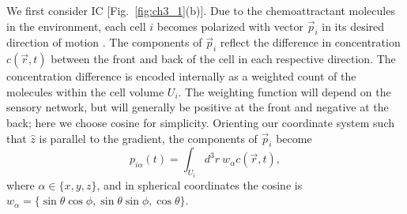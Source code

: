 We first consider IC [Fig.\ \ref{fig:ch3_1}(b)]. Due to the chemoattractant molecules in the environment, each cell $i$ becomes polarized with vector $\vec{p}_i$ in its desired direction of motion \cite{jilkine2011comparison}. The components of $\vec{p}_i$ reflect the difference in concentration $c(\vec{r},t)$ between the front and back of the cell in each respective direction.
The concentration difference is encoded internally as a weighted count of the molecules within the cell volume $U_i$. The weighting function will depend on the sensory network, but will generally be positive at the front and negative at the back; here we choose cosine for simplicity. Orienting our coordinate system such that $\hat{z}$ is parallel to the gradient, the components of $\vec{p}_i$ become
\begin{equation}
    p_{i\alpha}(t) = \int_{U_i} d^3r \ w_\alpha c(\vec{r},t) , \label{eq:ICcell}
\end{equation}
where $\alpha\in\{x,y,z\}$, and in spherical coordinates the cosine is $w_\alpha = \{\sin\theta \cos\phi, \sin\theta \sin\phi, \cos\theta\}$.


